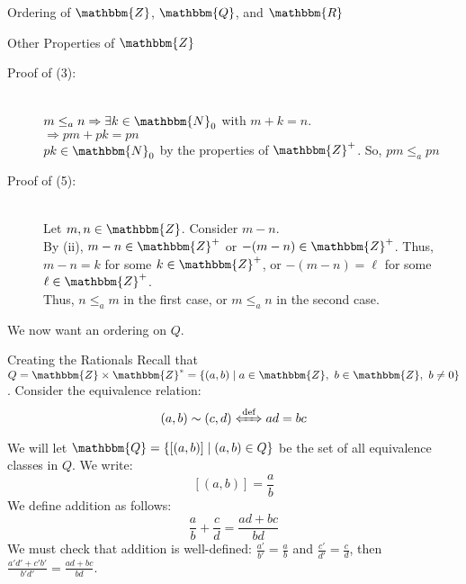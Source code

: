 \documentclass[10pt]{extarticle}
\newcommand{\N}{\mathbbm{N}}
\newcommand{\Q}{\mathbbm{Q}}
\newcommand{\Z}{\mathbbm{Z}}
\newcommand{\R}{\mathbbm{R}}
\begin{document}
\begin{problem}{Ordering of $\Z$, $\Q$, and $\R$}
\begin{problem}{Other Properties of $\Z$}
\begin{enumerate}[(\arabic*)]
      \end{enumerate}
      \tcblower
      \begin{description}
        \item[Proof of (3):]\hfill\\
          $m\leq_a n \Rightarrow \exists k\in \N_0$ with $m+k = n$.\\
          $\Rightarrow pm + pk = pn$\\
          $pk\in \N_0$ by the properties of $\Z^+$. So, $pm \leq_a pn$
        \item[Proof of (5):]\hfill\\
          Let $m,n\in\Z$. Consider $m-n$.\\
          By (ii), $m-n\in\Z^+$ or $-(m-n)\in\Z^+$. Thus, $m-n = k$ for some $k\in\Z^+$, or $-(m-n) = \ell$ for some $\ell\in\Z^+$.\\
          Thus, $n\leq_a m$ in the first case, or $m\leq_a n$ in the second case.
      \end{description}
    \end{problem}
    We now want an ordering on $Q$.
    \begin{problem}{Creating the Rationals}
      Recall that $Q = \Z \times \Z^* = \{(a,b) \mid a\in \Z,~b\in \Z,~b\neq 0\}$. Consider the equivalence relation:
      \[
        (a,b)\sim(c,d) \xLeftrightarrow{\text{def}} ad = bc
      \] 
      We will let $\Q = \{[(a,b)]\mid (a,b) \in Q\}$ be the set of all equivalence classes in $Q$. We write:
      \[
        [(a,b)] = \frac{a}{b}
      \] 
      We define addition as follows:
      \[
        \frac{a}{b} + \frac{c}{d} = \frac{ad + bc}{bd}
      \] 
      We must check that addition is well-defined: $\frac{a'}{b'} = \frac{a}{b}$ and $\frac{c'}{d'} = \frac{c}{d}$, then $\frac{a'd' + c'b'}{b'd'} = \frac{ad+bc}{bd}$.\\


\end{problem}
\end{problem}
\end{document}
